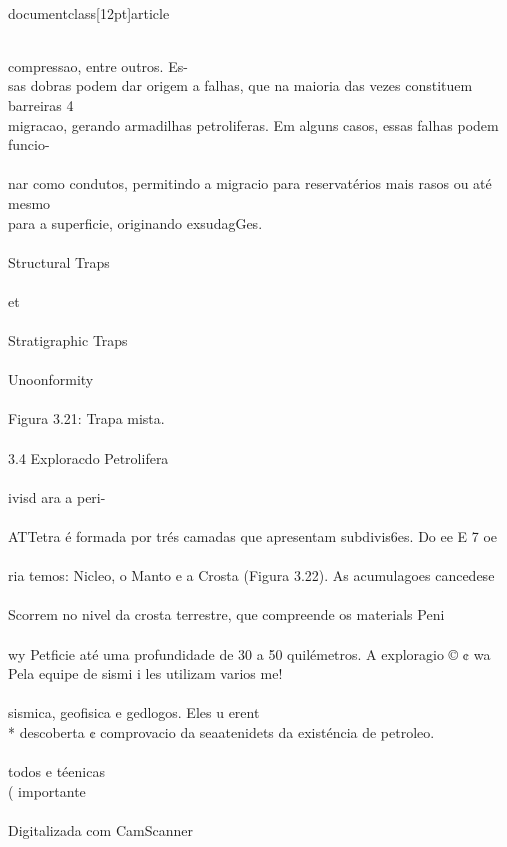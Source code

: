 \\documentclass[12pt]{article}
\begin{document}
{\\
compressao, entre outros. Es-\\
sas dobras podem dar origem a falhas, que na maioria das vezes constituem barreiras 4\\
migracao, gerando armadilhas petroliferas. Em alguns casos, essas falhas podem funcio-\\
\\
nar como condutos, permitindo a migracio para reservatérios mais rasos ou até mesmo\\
para a superficie, originando exsudagGes.\\
\\
Structural Traps\\
\\
et\\
\\
Stratigraphic Traps\\
\\
Unoonformity\\
\\
Figura 3.21: Trapa mista.\\
\\
3.4 Exploracdo Petrolifera\\
\\
ivisd ara a peri-\\
\\
ATTetra é formada por trés camadas que apresentam subdivis6es. Do ee E 7 oe\\
\\
ria temos: Nicleo, o Manto e a Crosta (Figura 3.22). As acumulagoes cancedese\\
\\
Scorrem no nivel da crosta terrestre, que compreende os materials Peni\\
\\
wy Petficie até uma profundidade de 30 a 50 quilémetros. A exploragio © ¢ wa\\
Pela equipe de sismi i les utilizam varios me!\\
\\
sismica, geofisica e gedlogos. Eles u erent\\
* descoberta ¢ comprovacio da seaatenidets da existéncia de petroleo.\\
\\
todos e téenicas\\
( importante\\
\\
Digitalizada com CamScanner\\

}
\end{document}
